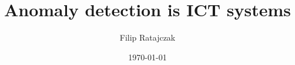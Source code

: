 \documentclass{article}
\title{Anomaly detection is ICT systems}
\author{Filip Ratajczak}
\date{\today}
\begin{document}
\maketitle
{}
\end{document}
